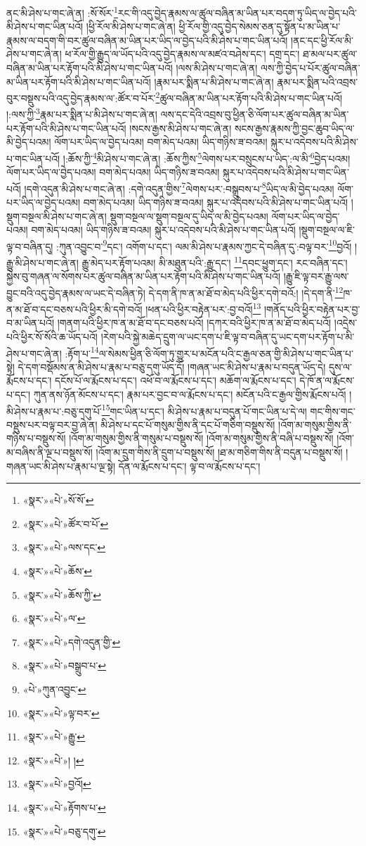 ནང་མི་ཤེས་པ་གང་ཞེ་ན། :སོ་སོར་\footnote{«སྣར་»«པེ་»སོ་སོ་}རང་གི་འདུ་བྱེད་རྣམས་ལ་ཚུལ་བཞིན་མ་ཡིན་པར་བདག་ཏུ་ཡིད་ལ་བྱེད་པའི་མི་ཤེས་པ་གང་ཡིན་པའོ། །ཕྱི་རོལ་མི་ཤེས་པ་གང་ཞེ་ན། ཕྱི་རོལ་གྱི་འདུ་བྱེད་སེམས་ཅན་དུ་སྟོན་པ་མ་ཡིན་པ་རྣམས་ལ་བདག་གི་བར་ཚུལ་བཞིན་མ་ཡིན་པར་ཡིད་ལ་བྱེད་པའི་མི་ཤེས་པ་གང་ཡིན་པའོ། །ནང་དང་ཕྱི་རོལ་མི་ཤེས་པ་གང་ཞེ་ན། ཕ་རོལ་གྱི་རྒྱུད་ལ་ཡོད་པའི་འདུ་བྱེད་རྣམས་ལ་མཛའ་བཤེས་དང་། དགྲ་དང་། ཐ་མལ་པར་ཚུལ་བཞིན་མ་ཡིན་པར་རྟོག་པའི་མི་ཤེས་པ་གང་ཡིན་པའོ། །ལས་མི་ཤེས་པ་གང་ཞེ་ན། ལས་ཀྱི་བྱེད་པ་པོར་ཚུལ་བཞིན་མ་ཡིན་པར་རྟོག་པའི་མི་ཤེས་པ་གང་ཡིན་པའོ། །རྣམ་པར་སྨིན་པ་མི་ཤེས་པ་གང་ཞེ་ན། རྣམ་པར་སྨིན་པའི་འབྲས་བུར་བསྡུས་པའི་འདུ་བྱེད་རྣམས་ལ་:ཚོར་བ་པོར་\footnote{«སྣར་»«པེ་»ཚོར་བ་པོ་}ཚུལ་བཞིན་མ་ཡིན་པར་རྟོག་པའི་མི་ཤེས་པ་གང་ཡིན་པའོ། །:ལས་ཀྱི་\footnote{«སྣར་»«པེ་»ལས་དང་}རྣམ་པར་སྨིན་པ་མི་ཤེས་པ་གང་ཞེ་ན། ལས་དང་དེའི་འབྲས་བུ་ཕྱིན་ཅི་ལོག་པར་ཚུལ་བཞིན་མ་ཡིན་པར་རྟོག་པའི་མི་ཤེས་པ་གང་ཡིན་པའོ། །སངས་རྒྱས་མི་ཤེས་པ་གང་ཞེ་ན། སངས་རྒྱས་རྣམས་ཀྱི་བྱང་ཆུབ་ཡིད་ལ་མི་བྱེད་པའམ། ལོག་པར་ཡིད་ལ་བྱེད་པའམ། བག་མེད་པའམ། ཡིད་གཉིས་ཟ་བའམ། སྐུར་པ་འདེབས་པའི་མི་ཤེས་པ་གང་ཡིན་པའོ། །:ཆོས་ཀྱི་\footnote{«སྣར་»«པེ་»ཆོས་}མི་ཤེས་པ་གང་ཞེ་ན། :ཆོས་ཀྱིས་\footnote{«སྣར་»«པེ་»ཆོས་ཀྱི་}ལེགས་པར་བསྲུངས་པ་ཡིད་:ལ་མི་\footnote{«སྣར་»«པེ་»ལ་}བྱེད་པའམ། ལོག་པར་ཡིད་ལ་བྱེད་པའམ། བག་མེད་པའམ། ཡིད་གཉིས་ཟ་བའམ། སྐུར་པ་འདེབས་པའི་མི་ཤེས་པ་གང་ཡིན་པའོ། །དགེ་འདུན་མི་ཤེས་པ་གང་ཞེ་ན། :དགེ་འདུན་གྱིས་\footnote{«སྣར་»«པེ་»དགེ་འདུན་གྱི་}ལེགས་པར་:བསྒྲུབས་པ་\footnote{«སྣར་»«པེ་»བསྒྲུབ་པ་}ཡིད་ལ་མི་བྱེད་པའམ། ལོག་པར་ཡིད་ལ་བྱེད་པའམ། བག་མེད་པའམ། ཡིད་གཉིས་ཟ་བའམ། སྐུར་པ་འདེབས་པའི་མི་ཤེས་པ་གང་ཡིན་པའོ། །སྡུག་བསྔལ་མི་ཤེས་པ་གང་ཞེ་ན། སྡུག་བསྔལ་ལ་སྡུག་བསྔལ་དུ་ཡིད་ལ་མི་བྱེད་པའམ། ལོག་པར་ཡིད་ལ་བྱེད་པའམ། བག་མེད་པའམ། ཡིད་གཉིས་ཟ་བའམ། སྐུར་པ་འདེབས་པའི་མི་ཤེས་པ་གང་ཡིན་པའོ། །སྡུག་བསྔལ་ལ་ཇི་ལྟ་བ་བཞིན་དུ། :ཀུན་འབྱུང་བ་\footnote{«པེ་»ཀུན་འབྱུང་}དང་། འགོག་པ་དང་། ལམ་མི་ཤེས་པ་རྣམས་ཀྱང་དེ་བཞིན་དུ་:བལྟ་བར་\footnote{«སྣར་»«པེ་»ལྟ་བར་}བྱའོ། །རྒྱུ་མི་ཤེས་པ་གང་ཞེ་ན། རྒྱུ་མེད་པར་རྟོག་པའམ། མི་མཐུན་པའི་:རྒྱུ་དང་། \footnote{«སྣར་»«པེ་»རྒྱུ་}དབང་ཕྱུག་དང་། རང་བཞིན་དང་། སྐྱེས་བུ་གཞན་ལ་སོགས་པར་ཚུལ་བཞིན་མ་ཡིན་པར་རྟོག་པའི་མི་ཤེས་པ་གང་ཡིན་པའོ། །རྒྱུ་ཇི་ལྟ་བར་རྒྱུ་ལས་བྱུང་བའི་འདུ་བྱེད་རྣམས་ལ་ཡང་དེ་བཞིན་ཏེ། དེ་དག་ནི་ཁ་ན་མ་ཐོ་བ་མེད་པའི་ཕྱིར་དགེ་བའོ:། །དེ་དག་ནི་\footnote{«སྣར་»«པེ་»། །}ཁ་ན་མ་ཐོ་བ་དང་བཅས་པའི་ཕྱིར་མི་དགེ་བའོ། །ཕན་པའི་ཕྱིར་བརྟེན་པར་:བྱ་བའོ།\footnote{«སྣར་»«པེ་»བྱའོ།} །གནོད་པའི་ཕྱིར་བརྟེན་པར་བྱ་བ་མ་ཡིན་པའོ། །གནག་པའི་ཕྱིར་ཁ་ན་མ་ཐོ་བ་དང་བཅས་པའོ། །དཀར་བའི་ཕྱིར་ཁ་ན་མ་ཐོ་བ་མེད་པའོ། །འདྲེས་པའི་ཕྱིར་སོ་སོའི་ཆ་ཡོད་པའོ། །རེག་པའི་སྐྱེ་མཆེད་དྲུག་ལ་ཡང་དག་པ་ཇི་ལྟ་བ་བཞིན་དུ་ཡང་དག་པར་རྟོག་པ་མི་ཤེས་པ་གང་ཞེ་ན། :རྟོག་པ་\footnote{«སྣར་»«པེ་»རྟོགས་པ་}ལ་སེམས་ཕྱིན་ཅི་ལོག་ཏུ་གྱུར་པ་མངོན་པའི་ང་རྒྱལ་ཅན་གྱི་མི་ཤེས་པ་གང་ཡིན་པ་སྟེ། དེ་དག་བསྡོམས་ན་མི་ཤེས་པ་རྣམ་པ་བཅུ་དགུ་ཡོད་དོ། །གཞན་ཡང་མི་ཤེས་པ་རྣམ་པ་བདུན་ཡོད་དེ། དུས་ལ་རྨོངས་པ་དང་། དངོས་པོ་ལ་རྨོངས་པ་དང་། འཕོ་བ་ལ་རྨོངས་པ་དང་། མཆོག་ལ་རྨོངས་པ་དང་། དེ་ཁོ་ན་ལ་རྨོངས་པ་དང་། ཀུན་ནས་ཉོན་མོངས་པ་དང་། རྣམ་པར་བྱང་བ་ལ་རྨོངས་པ་དང་། མངོན་པའི་ང་རྒྱལ་གྱིས་རྨོངས་པའོ། །མི་ཤེས་པ་རྣམ་པ་:བཅུ་དགུ་པོ་\footnote{«སྣར་»«པེ་»བཅུ་དགུ་}གང་ཡིན་པ་དང་། མི་ཤེས་པ་རྣམ་པ་བདུན་པོ་གང་ཡིན་པ་དེ་ལ། གང་གིས་གང་བསྡུས་པར་བལྟ་བར་བྱ་ཞེ་ན། མི་ཤེས་པ་དང་པོ་གསུམ་གྱིས་ནི་དང་པོ་གཅིག་བསྡུས་སོ། །འོག་མ་གསུམ་གྱིས་ནི་གཉིས་པ་བསྡུས་སོ། །འོག་མ་གསུམ་གྱིས་ནི་གསུམ་པ་བསྡུས་སོ། །འོག་མ་གསུམ་གྱིས་ནི་བཞི་པ་བསྡུས་སོ། །འོག་མ་བཞིས་ནི་ལྔ་པ་བསྡུས་སོ། །འོག་མ་དྲུག་གིས་ནི་དྲུག་པ་བསྡུས་སོ། །ཐ་མ་གཅིག་གིས་ནི་བདུན་པ་བསྡུས་སོ། །གཞན་ཡང་མི་ཤེས་པ་རྣམ་པ་ལྔ་སྟེ། དོན་ལ་རྨོངས་པ་དང་། ལྟ་བ་ལ་རྨོངས་པ་དང་། 